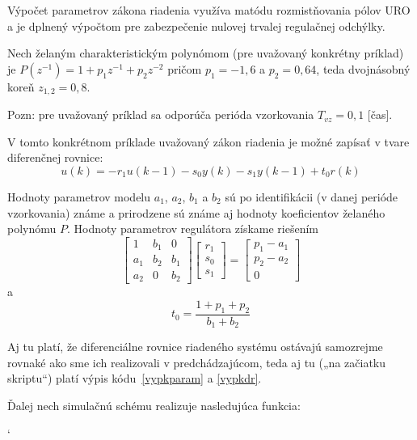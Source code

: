 \documentclass[a4paper, 10pt, ]{article}
\begin{document}
Výpočet parametrov zákona riadenia využíva matódu rozmistňovania pólov URO a je dplnený výpočtom pre zabezpečenie nulovej trvalej regulačnej odchýlky.

Nech želaným charakteristickým polynómom (pre uvažovaný konkrétny príklad) je $P(z^{-1}) = 1 + p_1z^{-1} + p_2z^{-2}$ pričom $p_1 = -1,6$ a $p_2 = 0,64$, teda dvojnásobný koreň $z_{1,2} = 0,8$.

Pozn: pre uvažovaný príklad sa odporúča perióda vzorkovania $T_{vz} = 0,1$ [čas].




V tomto konkrétnom príklade uvažovaný zákon riadenia je možné zapísať v tvare diferenčnej rovnice:
\begin{equation}
	u(k) =  - r_1 u(k-1) - s_0 y(k) - s_1 y(k-1) + t_0 r(k)
\end{equation}

Hodnoty parametrov modelu $a_1$, $a_2$, $b_1$ a $b_2$ sú po identifikácii (v danej perióde vzorkovania) známe a prirodzene sú známe aj hodnoty koeficientov želaného polynómu $P$. Hodnoty parametrov regulátora získame riešením
\begin{equation}
	\begin{bmatrix} 1 & b_1 & 0 \\ a_1 & b_2 & b_1 \\ a_2 &   0 & b_2 \end{bmatrix}
	\begin{bmatrix} r_1 \\ s_0 \\ s_1  \end{bmatrix}
	=
	\begin{bmatrix} p_1 - a_1 \\ p_2 - a_2 \\ 0 \end{bmatrix}
\end{equation}
a
\begin{equation}
		t_0 = \frac{1 + p_1 + p_2}{b_1 + b_2}
\end{equation}


\bigskip

\noindent
Aj tu platí, že diferenciálne rovnice riadeného systému ostávajú samozrejme rovnaké ako sme ich realizovali v predchádzajúcom, teda aj tu („na začiatku skriptu“) platí výpis kódu~\ref{vypkparam} a \ref{vypkdr}.

\bigskip

\noindent
Ďalej nech simulačnú schému realizuje nasledujúca funkcia:

{\catcode`

}
\end{document}
